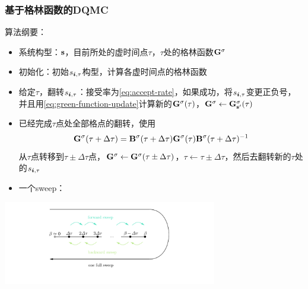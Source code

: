 \documentclass[UTF8]{ctexbeamer}
\begin{document}
\begin{frame}
\frametitle{基于格林函数的DQMC}

算法纲要：
\begin{itemize}
    \item 系统构型：$\vb{s}$，目前所处的虚时间点$\tau$，$\tau$处的格林函数$\vb{G}^\sigma$
    \item 初始化：初始$s_{\vb*{i}, \tau}$构型，计算各虚时间点的格林函数
    \item 给定$\tau$，翻转$s_{\vb*{i}, \tau}$：接受率为\eqref{eq:accept-rate}，如果成功，将$s_{\vb*{i}, \tau}$变更正负号，并且用\eqref{eq:green-function-update}计算新的$\vb{G}^\sigma(\tau)$，$\vb{G}^\sigma \leftarrow \vb{G}^\sigma_{\vb{s}'}(\tau)$
    \item 已经完成$\tau$点处全部格点的翻转，使用
    \begin{equation}
        \vb{G}^\sigma(\tau + \Delta \tau) = \vb{B}^\sigma(\tau + \Delta \tau) \vb{G}^\sigma(\tau) \vb{B}^\sigma(\tau + \Delta \tau)^{-1}
    \end{equation}
    从$\tau$点转移到$\tau \pm \Delta \tau$点，$\vb{G}^\sigma \leftarrow \vb{G}^\sigma(\tau \pm \Delta \tau)$，$\tau \leftarrow \tau \pm \Delta \tau$，然后去翻转新的$\tau$处的$s_{\vb*{i}, \tau}$
    \item 一个sweep：
\end{itemize}

\begin{center}
    \includegraphics[width=0.7\textwidth]{sweeping.pdf}
\end{center}

\end{frame}
\end{document}
